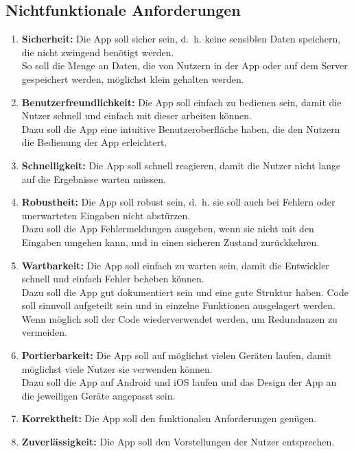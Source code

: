 \subsection{Nichtfunktionale Anforderungen}

\begin{enumerate}
	\item \textbf{Sicherheit:} Die App soll sicher sein, d. h. keine sensiblen Daten speichern, die nicht zwingend benötigt werden.\\
	So soll die Menge an Daten, die von Nutzern in der App oder auf dem Server gespeichert werden, möglichst klein gehalten werden.
	\item \textbf{Benutzerfreundlichkeit:} Die App soll einfach zu bedienen sein, damit die Nutzer schnell und einfach mit dieser arbeiten können.\\
	Dazu soll die App eine intuitive Benutzeroberfläche haben, die den Nutzern die Bedienung der App erleichtert.
	\item \textbf{Schnelligkeit:} Die App soll schnell reagieren, damit die Nutzer nicht lange auf die Ergebnisse warten müssen.
	\item \textbf{Robustheit:} Die App soll robust sein, d. h. sie soll auch bei Fehlern oder unerwarteten Eingaben nicht abstürzen.\\
	Dazu soll die App Fehlermeldungen ausgeben, wenn sie nicht mit den Eingaben umgehen kann, und in einen sicheren Zustand zurückkehren.
	\item \textbf{Wartbarkeit:} Die App soll einfach zu warten sein, damit die Entwickler schnell und einfach Fehler beheben können.\\
	Dazu soll die App gut dokumentiert sein und eine gute Struktur haben.
	Code soll sinnvoll aufgeteilt sein und in einzelne Funktionen ausgelagert werden.
	Wenn möglich soll der Code wiederverwendet werden, um Redundanzen zu vermeiden.
	\item \textbf{Portierbarkeit:} Die App soll auf möglichst vielen Geräten laufen, damit möglichst viele Nutzer sie verwenden können.\\
	Dazu soll die App auf Android und iOS laufen und das Design der App an die jeweiligen Geräte angepasst sein.
	\item \textbf{Korrektheit:} Die App soll den funktionalen Anforderungen genügen.
	\item \textbf{Zuverlässigkeit:} Die App soll den Vorstellungen der Nutzer entsprechen.
\end{enumerate}

